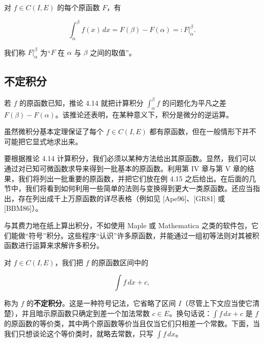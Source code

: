 \begin{corollary}

对 $ f \in C(I, E) $ 的每个原函数 $ F $，有

\[
\int_{\alpha}^{\beta} f(x) \, dx = F(\beta) - F(\alpha) =: \left. F \right|_{\alpha}^{\beta} .
\]

我们称 $ \left. F \right|_{\alpha}^{\beta} $ 为“$ F $ 在 $ \alpha $ 与 $ \beta $ 之间的取值”。

\end{corollary}

\subsection*{不定积分}

若 $ f $ 的原函数已知，推论 4.14 就把计算积分 $ \int_{\alpha}^{\beta} f $ 的问题化为平凡之差 $ F(\beta) - F(\alpha) $。该推论还表明，在某种意义下，积分是微分的逆运算。

虽然微积分基本定理保证了每个 $ f \in C(I, E) $ 都有原函数，但在一般情形下并不可能把它显式地求出来。

要根据推论 4.14 计算积分，我们必须以某种方法给出其原函数。显然，我们可以通过对已知可微函数求导来得到一批基本的原函数。利用第 IV 章与第 V 章的结果，我们将列出一批重要的原函数，并把它们放在例 4.15 之后给出。在后面的几节中，我们将看到如何利用一些简单的法则与变换得到更大一类原函数。还应当指出，存在列出成千上万原函数的详尽表格（例如见 [Ape96]、[GR81] 或 [BBM86]）。

与其费力地在纸上算出积分，不如使用 Maple 或 Mathematica 之类的软件包，它们能做“符号”积分。这些程序“认识”许多原函数，并能通过一组初等法则对其被积函数进行运算来求解许多积分。

对 $ f \in C(I, E) $，我们把 $ f $ 的原函数区间中的

\[
\int f \, dx + c,
\]

称为 $ f $ 的\textbf{不定积分}。这是一种符号记法，它省略了区间 $ I $（尽管上下文应当使它清楚），并且暗示原函数只确定到差一个加法常数 $ c \in E $。换句话说：$ \int f \, dx + c $ 是 $ f $ 的原函数的等价类，其中两个原函数等价当且仅当它们只相差一个常数。下面，当我们只想谈论这个等价类时，就略去常数，只写 $ \int f \, dx $。

